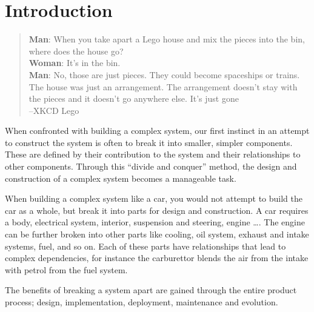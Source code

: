 \chapter{Introduction}


\begin{quotation}
\textbf{Man}: When you take apart a Lego house and mix the pieces into the bin, where does the house go?\\
\textbf{Woman}: It's in the bin.\\
\textbf{Man}: No, those are just pieces. They could become spaceships or trains. 
The house was just an arrangement. The arrangement doesn't stay with the pieces and it doesn't go anywhere else. It's just gone\\
--XKCD Lego
\end{quotation}

{}When confronted with building a complex system, our first instinct in an attempt to construct the system is often to break it into smaller, simpler components. 
{}These are defined by their contribution to the system and their relationships to other components.
{}Through this ``divide and conquer'' method, the design and construction of a complex system becomes a manageable task.

When building a complex system like a car, you would not attempt to build the car as a whole, but break it into parts for design and construction.
A car requires a body, electrical system, interior, suspension and steering, engine \ldots. 
The engine can be further broken into other parts like cooling, oil system, exhaust and intake systems, fuel, and so on.
Each of these parts have relationships that lead to complex dependencies, for instance the carburettor blends the air from the intake with petrol from the fuel system.

The benefits of breaking a system apart are gained through the entire product process; design, implementation, deployment, maintenance and evolution.


